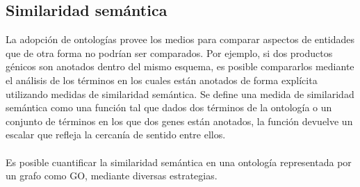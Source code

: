 \subsection{Similaridad semántica}
La adopción de ontologías provee los medios para comparar aspectos de entidades que de otra forma no podrían ser comparados. Por ejemplo, si dos productos génicos son anotados dentro del mismo esquema, es posible compararlos mediante el análisis de los términos en los cuales están anotados de forma explícita utilizando medidas de similaridad semántica. Se define una medida de similaridad semántica como una función tal que dados dos términos de la ontología o un conjunto de términos en los que dos genes están anotados, la función devuelve un escalar que refleja la cercanía de sentido entre ellos.\\\\
Es posible cuantificar la similaridad semántica en una ontología representada por un grafo como GO, mediante diversas estrategias.
